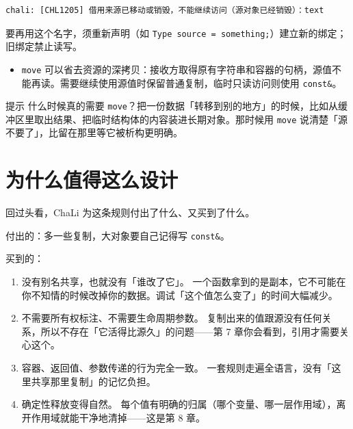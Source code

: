 \par
\medskip
\begin{lstlisting}[style=out]
chali: [CHL1205] 借用来源已移动或销毁，不能继续访问（源对象已经销毁）：text
\end{lstlisting}
\par
\medskip

要再用这个名字，须重新声明（如 \texttt{Type source =\allowbreak{} something;}）建立新的绑定；旧绑定禁止读写。

\begin{itemize}

\item \texttt{move} 可以省去资源的深拷贝：接收方取得原有字符串和容器的句柄，源值不能再读。需要继续使用源值时保留普通复制，临时只读访问则使用 \texttt{const\&}。

\end{itemize}

\begin{tip}{提示}
什么时候真的需要 \texttt{move}？把一份数据「转移到别的地方」的时候，比如从缓冲区里取出结果、把临时结构体的内容装进长期对象。那时候用 \texttt{move} 说清楚「源不要了」，比留在那里等它被析构更明确。
\end{tip}

\section{为什么值得这么设计}

回过头看，ChaLi 为这条规则付出了什么、又买到了什么。

付出的：多一些复制，大对象要自己记得写 \texttt{const\&}。

买到的：

\begin{enumerate}

\item 没有别名共享，也就没有「谁改了它」。 一个函数拿到的是副本，它不可能在你不知情的时候改掉你的数据。调试「这个值怎么变了」的时间大幅减少。

\item 不需要所有权标注、不需要生命周期参数。 复制出来的值跟源没有任何关系，所以不存在「它活得比源久」的问题——第 7 章你会看到，引用才需要关心这个。

\item 容器、返回值、参数传递的行为完全一致。 一套规则走遍全语言，没有「这里共享那里复制」的记忆负担。

\item 确定性释放变得自然。 每个值有明确的归属（哪个变量、哪一层作用域），离开作用域就能干净地清掉——这是第 8 章。

\end{enumerate}

